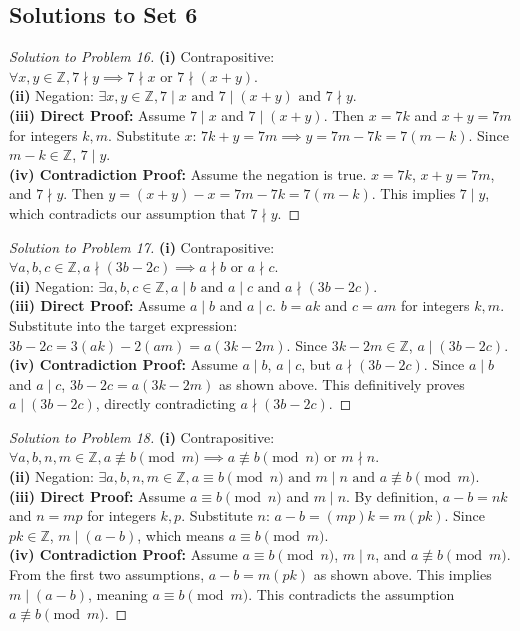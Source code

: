 \documentclass{article}
\begin{document}
\subsection{Solutions to Set 6}
\begin{proof}[Solution to Problem 16]
\textbf{(i)} Contrapositive: $\forall x,y \in \mathbb{Z}, 7 \nmid y \implies 7 \nmid x \text{ or } 7 \nmid (x+y)$. \\
\textbf{(ii)} Negation: $\exists x,y \in \mathbb{Z}, 7 \mid x \text{ and } 7 \mid (x+y) \text{ and } 7 \nmid y$. \\
\textbf{(iii) Direct Proof:} Assume $7 \mid x$ and $7 \mid (x+y)$. Then $x = 7k$ and $x+y = 7m$ for integers $k,m$. Substitute $x$: $7k + y = 7m \implies y = 7m - 7k = 7(m-k)$. Since $m-k \in \mathbb{Z}$, $7 \mid y$. \\
\textbf{(iv) Contradiction Proof:} Assume the negation is true. $x = 7k$, $x+y = 7m$, and $7 \nmid y$. Then $y = (x+y) - x = 7m - 7k = 7(m-k)$. This implies $7 \mid y$, which contradicts our assumption that $7 \nmid y$.
\end{proof}

\begin{proof}[Solution to Problem 17]
\textbf{(i)} Contrapositive: $\forall a,b,c \in \mathbb{Z}, a \nmid (3b-2c) \implies a \nmid b \text{ or } a \nmid c$. \\
\textbf{(ii)} Negation: $\exists a,b,c \in \mathbb{Z}, a \mid b \text{ and } a \mid c \text{ and } a \nmid (3b-2c)$. \\
\textbf{(iii) Direct Proof:} Assume $a \mid b$ and $a \mid c$. $b = ak$ and $c = am$ for integers $k,m$. Substitute into the target expression: $3b - 2c = 3(ak) - 2(am) = a(3k - 2m)$. Since $3k-2m \in \mathbb{Z}$, $a \mid (3b-2c)$. \\
\textbf{(iv) Contradiction Proof:} Assume $a \mid b$, $a \mid c$, but $a \nmid (3b-2c)$. Since $a \mid b$ and $a \mid c$, $3b-2c = a(3k-2m)$ as shown above. This definitively proves $a \mid (3b-2c)$, directly contradicting $a \nmid (3b-2c)$.
\end{proof}

\begin{proof}[Solution to Problem 18]
\textbf{(i)} Contrapositive: $\forall a,b,n,m \in \mathbb{Z}, a \not\equiv b \pmod m \implies a \not\equiv b \pmod n \text{ or } m \nmid n$. \\
\textbf{(ii)} Negation: $\exists a,b,n,m \in \mathbb{Z}, a \equiv b \pmod n \text{ and } m \mid n \text{ and } a \not\equiv b \pmod m$. \\
\textbf{(iii) Direct Proof:} Assume $a \equiv b \pmod n$ and $m \mid n$. By definition, $a-b = nk$ and $n = mp$ for integers $k,p$. Substitute $n$: $a-b = (mp)k = m(pk)$. Since $pk \in \mathbb{Z}$, $m \mid (a-b)$, which means $a \equiv b \pmod m$. \\
\textbf{(iv) Contradiction Proof:} Assume $a \equiv b \pmod n$, $m \mid n$, and $a \not\equiv b \pmod m$. From the first two assumptions, $a-b = m(pk)$ as shown above. This implies $m \mid (a-b)$, meaning $a \equiv b \pmod m$. This contradicts the assumption $a \not\equiv b \pmod m$.
\end{proof}
\end{document}
